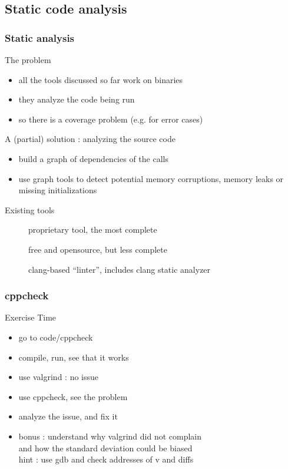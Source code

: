 \subsection[static]{Static code analysis}

\begin{frame}[fragile]
  \frametitle{Static analysis}
  \begin{alertblock}{The problem}
    \begin{itemize}
    \item all the tools discussed so far work on binaries
    \item they analyze the code being run
    \item so there is a coverage problem (e.g. for error cases)
    \end{itemize}
  \end{alertblock}
  \pause
  \begin{block}{A (partial) solution : analyzing the source code}
    \begin{itemize}
    \item build a graph of dependencies of the calls
    \item use graph tools to detect potential memory corruptions,
      memory leaks or missing initializations
    \end{itemize}
  \end{block}
  \pause
  \begin{block}{Existing tools}
    \begin{description}
    \item[\href{http://www.coverity.com/}{}]
      proprietary tool, the most complete
    \item[\href{http://cppcheck.sourceforge.net/}{}]
      free and opensource, but less complete
    \item[\href{https://clang.llvm.org/extra/clang-tidy/}{}]
      clang-based ``linter'', includes clang static analyzer
    \end{description}
  \end{block}
\end{frame}

\begin{frame}[fragile]
  \frametitle{cppcheck}
  \begin{alertblock}{Exercise Time}
    \begin{itemize}
    \item go to code/cppcheck
    \item compile, run, see that it works
    \item use valgrind : no issue
    \item use cppcheck, see the problem
    \item analyze the issue, and fix it
    \item bonus : understand why valgrind did not complain \\
      and how the standard deviation could be biased \\
      hint : use gdb and check addresses of v and diffs
    \end{itemize}
  \end{alertblock}
\end{frame}

